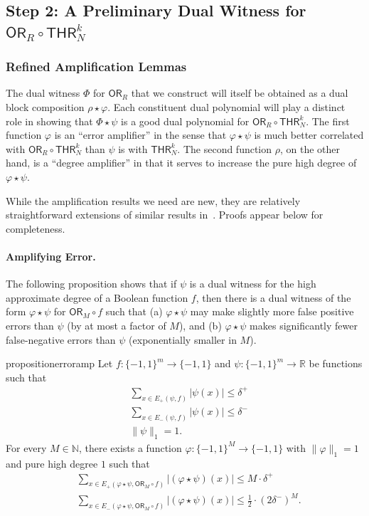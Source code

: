\documentclass[11pt, letterpaper, fleqn]{article}
\theoremstyle{plain}
\newcommand{\R}{\mathbb{R}}
\newcommand{\OR}{\mathsf{ OR}}
\newcommand{\THR}{\mathsf{THR}}
\newcommand{\bits}{\{-1,1\}}
\newcommand{\ls}{\star}
\newcommand{\N}{\mathbb{N}}
\begin{document}
\subsection{Step 2: A Preliminary Dual Witness for \texorpdfstring{$\OR_R \circ \THR^k_N$}{OR o THR}}
\label{sec:k-dist-step2}

\subsubsection{Refined Amplification Lemmas}

The dual witness $\Phi$ for $\OR_R$
that we construct will itself be obtained as a dual block composition $\rho \ls \varphi$. Each constituent dual polynomial will play a distinct role in showing that $\Phi \ls \psi$ is a good dual polynomial for $\OR_R \circ \THR^k_N$. The first function $\varphi$ is an ``error amplifier'' in the sense that $\varphi \ls \psi$ is much better correlated with $\OR_R \circ \THR^k_N$ than $\psi$ is with $\THR^k_N$. The second function $\rho$, on the other hand, is a ``degree amplifier'' in that it serves to increase the pure high degree of $\varphi \ls \psi$.

While the amplification results we need are new, they are relatively straightforward extensions of similar results in~\cite{bt13, sherstovandor, bt14}. Proofs appear below for completeness.

\paragraph{Amplifying Error.} The following proposition shows that
if $\psi$ is a dual witness for the high approximate degree of a Boolean function $f$, 
then there is a dual witness of the form $\varphi \ls \psi$ for $\OR_M \circ f$
such that (a) $\varphi \ls \psi$ may make slightly more false positive errors
than $\psi$ (by at most a factor of $M$), and (b) $\varphi \ls \psi$
makes significantly fewer false-negative errors than $\psi$ (exponentially
smaller in $M$). 

\begin{restatable}{proposition}{erroramp} \label{prop:error-amp}
Let $f : \bits^m \to \bits$ and $\psi : \bits^m \to \R$ be functions such that
\begin{align} &\sum_{x \in E_+(\psi, f)} |\psi(x)| \le \delta^+ \label{eqn:error-base-pos} \\
& \sum_{x \in E_-(\psi, f)} |\psi(x)| \le \delta^- \label{eqn:error-base-neg} \\
& \|\psi\|_1 = 1.\label{eqn:error-base-norm}
\end{align}
For every $M \in \N$, there exists a function $\varphi : \bits^M \to \bits$ with $\|\varphi\|_1 = 1$ and pure high degree $1$ such that
\begin{align} & \sum_{x \in E_+(\varphi \ls \psi, \OR_M \circ f)} |(\varphi \ls \psi)(x)| \le M \cdot \delta^+ \label{eqn:error-amp-pos} \\
& \sum_{x \in E_-(\varphi \ls \psi, \OR_M \circ f)} |(\varphi \ls \psi)(x)| \le  \frac{1}{2} \cdot (2\delta^-)^M.\label{eqn:error-amp-neg}
\end{align}
\end{restatable}
\end{document}
